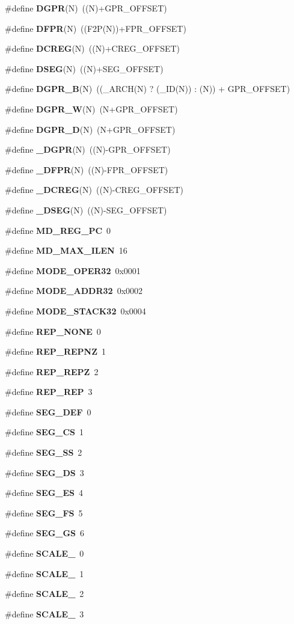 \begin{CompactItemize}
\item 
\#define {\bf DGPR}(N)~((N)+GPR\_\-OFFSET)
\item 
\#define {\bf DFPR}(N)~((F2P(N))+FPR\_\-OFFSET)
\item 
\#define {\bf DCREG}(N)~((N)+CREG\_\-OFFSET)
\item 
\#define {\bf DSEG}(N)~((N)+SEG\_\-OFFSET)
\item 
\#define {\bf DGPR\_\-B}(N)~((\_\-ARCH(N) ? (\_\-ID(N)) : (N)) + GPR\_\-OFFSET)
\item 
\#define {\bf DGPR\_\-W}(N)~(N+GPR\_\-OFFSET)
\item 
\#define {\bf DGPR\_\-D}(N)~(N+GPR\_\-OFFSET)
\item 
\#define {\bf \_\-DGPR}(N)~((N)-GPR\_\-OFFSET)
\item 
\#define {\bf \_\-DFPR}(N)~((N)-FPR\_\-OFFSET)
\item 
\#define {\bf \_\-DCREG}(N)~((N)-CREG\_\-OFFSET)
\item 
\#define {\bf \_\-DSEG}(N)~((N)-SEG\_\-OFFSET)
\item 
\#define {\bf MD\_\-REG\_\-PC}~0
\item 
\#define {\bf MD\_\-MAX\_\-ILEN}~16
\item 
\#define {\bf MODE\_\-OPER32}~0x0001
\item 
\#define {\bf MODE\_\-ADDR32}~0x0002
\item 
\#define {\bf MODE\_\-STACK32}~0x0004
\item 
\#define {\bf REP\_\-NONE}~0
\item 
\#define {\bf REP\_\-REPNZ}~1
\item 
\#define {\bf REP\_\-REPZ}~2
\item 
\#define {\bf REP\_\-REP}~3
\item 
\#define {\bf SEG\_\-DEF}~0
\item 
\#define {\bf SEG\_\-CS}~1
\item 
\#define {\bf SEG\_\-SS}~2
\item 
\#define {\bf SEG\_\-DS}~3
\item 
\#define {\bf SEG\_\-ES}~4
\item 
\#define {\bf SEG\_\-FS}~5
\item 
\#define {\bf SEG\_\-GS}~6
\item 
\#define {\bf SCALE\_}~0
\item 
\#define {\bf SCALE\_}~1
\item 
\#define {\bf SCALE\_}~2
\item 
\#define {\bf SCALE\_}~3
\item 

\end{CompactItemize}
